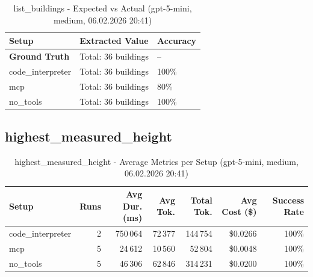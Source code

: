 \documentclass[a4paper,11pt]{article}
\begin{document}
\begin{table}[H]
\centering
\scriptsize
\caption{list\_buildings - Expected vs Actual (gpt-5-mini, medium, 06.02.2026 20:41)}
\begin{tabular}{l l l}
\toprule
Setup & Extracted Value & Accuracy \\
\midrule
\textbf{Ground Truth} & Total: 36 buildings & -- \\
\midrule
code\_interpreter & Total: 36 buildings & 100\% \\
mcp & Total: 36 buildings & 80\% \\
no\_tools & Total: 36 buildings & 100\% \\
\bottomrule
\end{tabular}
\end{table}

\clearpage

\subsection{highest\_measured\_height}

\begin{table}[H]
\centering
\scriptsize
\caption{highest\_measured\_height - Average Metrics per Setup (gpt-5-mini, medium, 06.02.2026 20:41)}
\label{tab:combined\_highest\_measured\_height\_metrics\_20260206}
\begin{tabular}{l r r r r r r}
\toprule
Setup & Runs & Avg Dur. (ms) & Avg Tok. & Total Tok. & Avg Cost (\$) & Success Rate \\
\midrule
code\_interpreter & 2 & 750\,064 & 72\,377 & 144\,754 & \$0.0266 & 100\% \\
mcp & 5 & 24\,612 & 10\,560 & 52\,804 & \$0.0048 & 100\% \\
no\_tools & 5 & 46\,306 & 62\,846 & 314\,231 & \$0.0200 & 100\% \\
\bottomrule
\end{tabular}
\end{table}
\end{document}

